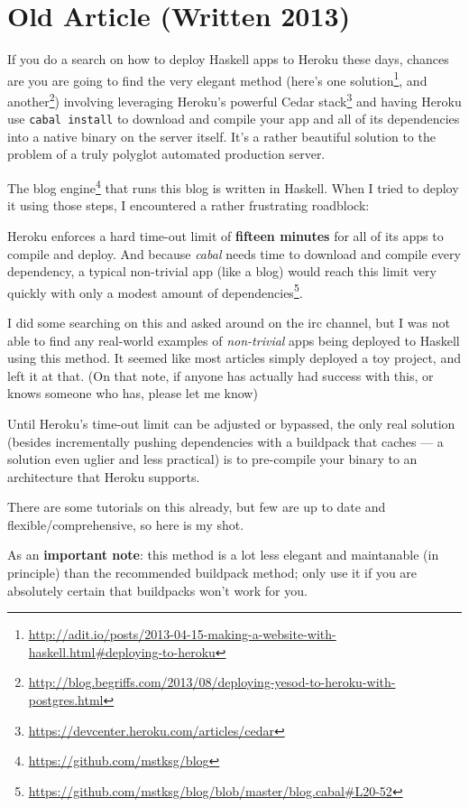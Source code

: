 \documentclass[]{article}
\renewcommand{\href}[2]{#2\footnote{\url{#1}}}
\begin{document}
\section{Old Article (Written 2013)}\label{old-article-written-2013}

If you do a search on how to deploy Haskell apps to Heroku these days, chances
are you are going to find the very elegant method (here's
\href{http://adit.io/posts/2013-04-15-making-a-website-with-haskell.html\#deploying-to-heroku}{one
solution}, and
\href{http://blog.begriffs.com/2013/08/deploying-yesod-to-heroku-with-postgres.html}{another})
involving leveraging Heroku's powerful
\href{https://devcenter.heroku.com/articles/cedar}{Cedar stack} and having
Heroku use \texttt{cabal\ install} to download and compile your app and all of
its dependencies into a native binary on the server itself. It's a rather
beautiful solution to the problem of a truly polyglot automated production
server.

The \href{https://github.com/mstksg/blog}{blog engine} that runs this blog is
written in Haskell. When I tried to deploy it using those steps, I encountered a
rather frustrating roadblock:

Heroku enforces a hard time-out limit of \textbf{fifteen minutes} for all of its
apps to compile and deploy. And because \emph{cabal} needs time to download and
compile every dependency, a typical non-trivial app (like a blog) would reach
this limit very quickly with only a
\href{https://github.com/mstksg/blog/blob/master/blog.cabal\#L20-52}{modest
amount of dependencies}.

I did some searching on this and asked around on the irc channel, but I was not
able to find any real-world examples of \emph{non-trivial} apps being deployed
to Haskell using this method. It seemed like most articles simply deployed a toy
project, and left it at that. (On that note, if anyone has actually had success
with this, or knows someone who has, please let me know)

Until Heroku's time-out limit can be adjusted or bypassed, the only real
solution (besides incrementally pushing dependencies with a buildpack that
caches --- a solution even uglier and less practical) is to pre-compile your
binary to an architecture that Heroku supports.

There are some tutorials on this already, but few are up to date and
flexible/comprehensive, so here is my shot.

As an \textbf{important note}: this method is a lot less elegant and maintanable
(in principle) than the recommended buildpack method; only use it if you are
absolutely certain that buildpacks won't work for you.
\end{document}
